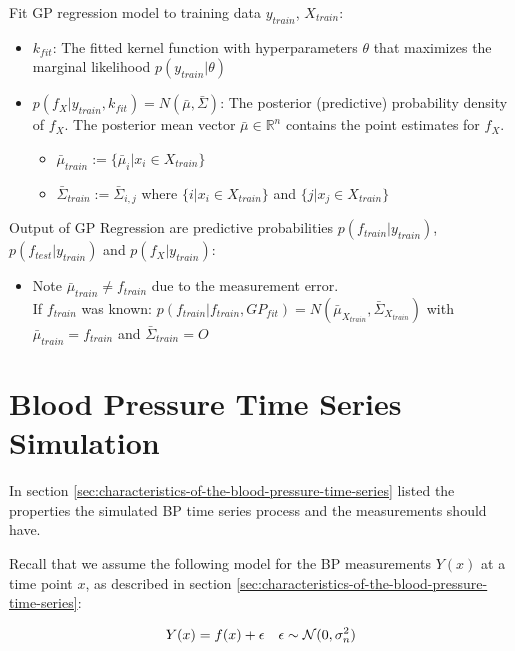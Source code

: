 	Fit GP regression model to training data $y_{train}$, $X_{train}$:
    \begin{itemize}
        \item $k_{fit}$: The fitted kernel function with hyperparameters $\theta$ that maximizes the marginal likelihood
        $p(y_{train}| \theta)$
        \item $p(f_X| y_{train}, k_{fit}) = N(\bar{\mu}, \bar{\Sigma})$:
        The posterior (predictive) probability density of $f_X$. The posterior mean vector
        $\bar{\mu} \in \mathbb{R}^n$ contains the point estimates for $f_X$.
        \begin{itemize}
            \item $\bar{\mu}_{train} := \{\bar{\mu}_i | x_i \in X_{train}\}$
            \item $\bar{\Sigma}_{train} := \bar{\Sigma}_{i,j}$ where $\{i | x_i \in X_{train}\}$ and $\{j | x_j \in X_{train}\}$

        \end{itemize}
    \end{itemize}

	Output of GP Regression are predictive probabilities $p(f_{train}| y_{train})$,
		$p(f_{test}| y_{train})$ and $p(f_{X}| y_{train})$:
			\begin{itemize}
				\item Note $\bar{\mu}_{train} \neq f_{train}$ due to the measurement error. \\ If
				$f_{train}$ was known: $p(f_{train}| f_{train}, GP_{fit}) = N(\bar{\mu}_{X_{train}},
				\bar{\Sigma}_{X_{train}})$
				with $\bar{\mu}_{train} = f_{train}$ and $\bar{\Sigma}_{train} = {\displaystyle O}$
			\end{itemize}

\section{Blood Pressure Time Series Simulation}\label{sec:blood-pressure-time-series-simulation}

In section \ref{sec:characteristics-of-the-blood-pressure-time-series} listed
the properties the simulated BP time series process and the measurements should have.

Recall that we assume the following model for the BP measurements $Y(x)$ at a time point $x$, as
described in section \ref{sec:characteristics-of-the-blood-pressure-time-series}:

\begin{align*}
    Y(x) = f(x) + \epsilon && \epsilon \sim \operatorname{\mathcal{N}}(0, \sigma_n^{2})
\end{align*}

